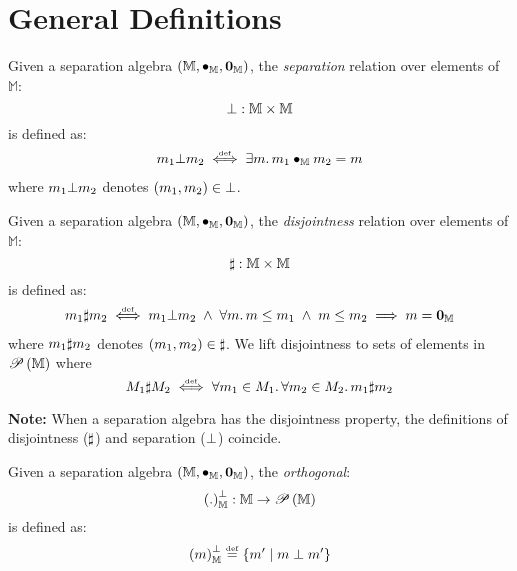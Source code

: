 \section*{General Definitions}
%
\begin{definition}[Separation]
Given a separation algebra $\left(\mathbb{M}, \bullet_{\mathbb{M}}, \mathbf{0}_{\mathbb{M}} \right)$, the \emph{separation} relation over elements of $\mathbb{M}$:
%
\[
\bot : \mathbb{M} \times \mathbb{M}
\]
%
is defined as:
%
\[
\begin{array}{l}
	m_1 \bot m_2 \mathrel{\stackrel{\smash{\scriptscriptstyle{\mathrm{def}}}}{\iff}} \exists m.\, m_1 \bullet_{\mathbb{M}} m_2 = m 
\end{array}
\]
%
where $m_1 \bot m_2$ denotes $(m_1, m_2) \in \bot$. 
\end{definition}
%
%
\begin{definition}[Disjointness]
Given a separation algebra $\left(\mathbb{M}, \bullet_{\mathbb{M}}, \mathbf{0}_{\mathbb{M}} \right)$, the \emph{disjointness} relation over elements of $\mathbb{M}$:
%
\[
\sharp : \mathbb{M} \times \mathbb{M}
\]
%
is defined as:
%
\[
\begin{array}{l}
	m_1 \sharp m_2 \mathrel{\stackrel{\smash{\scriptscriptstyle{\mathrm{def}}}}{\iff}} m_1 \bot m_2 \;\land\; \forall m.\, m \leq m_1 \;\land\; m \leq m_2 \implies m = \mathbf{0}_{\mathbb{M}}
\end{array}
\]
%
where $m_1 \sharp m_2$ denotes $(m_1, m_2) \in \sharp$. We lift disjointness to sets of elements in $\mathscr{P}\left(\mathbb{M} \right)$ where
%
\[
	M_1 \sharp M_2 \mathrel{\stackrel{\smash{\scriptscriptstyle{\mathrm{def}}}}{\iff}} \forall m_1 \in M_1.\,\forall m_2 \in M_2.\, m_1 \sharp m_2
\]
%
\end{definition}
%
%
\noindent\textbf{Note: } When a separation algebra has the disjointness property, the definitions of disjointness ($\sharp$) and separation ($\bot$) coincide.
%
%
\begin{definition}[Orthogonal]
Given a separation algebra $\left(\mathbb{M}, \bullet_{\mathbb{M}}, \mathbf{0}_{\mathbb{M}} \right)$, the \emph{orthogonal}:
%
\[
\left( .\right)_{\mathbb{M}}^{\bot} : \mathbb{M} \rightarrow \mathscr{P}\left(\mathbb{M} \right)
\]
%
is defined as:
%
\[
	\left( m\right)_{\mathbb{M}}^{\bot} \mathrel{\stackrel{\smash{\scriptscriptstyle{\mathrm{def}}}}{=}} \left\{ m' \;|\; m \;\bot\; m'\right\}
\]
%
%
\end{definition}
%
%
